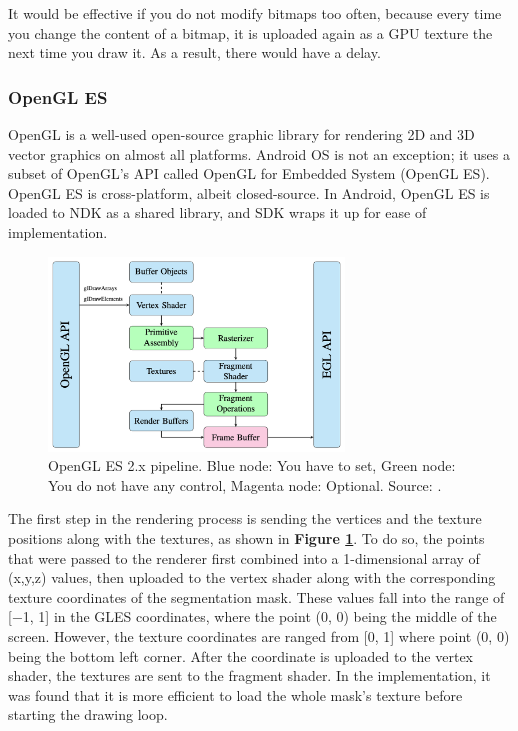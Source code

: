 It would be effective if you do not modify bitmaps too often, because every time you change the content of a bitmap, it is uploaded again as a GPU texture the next time you draw it. As a result, there would have a delay. \par

\subsubsection{OpenGL ES}
OpenGL is a well-used open-source graphic library for rendering 2D and 3D vector graphics on almost all platforms. Android OS is not an exception; it uses a subset of OpenGL’s API called OpenGL for Embedded System (OpenGL ES). OpenGL ES is cross-platform, albeit closed-source. In Android, OpenGL ES is loaded to NDK as a shared library, and SDK wraps it up for ease of implementation.
\par

\begin{figure} [H]
    \centering
    \includegraphics[width=0.7\textwidth]{chapter3/image/openglpipeline.png}
    \caption{OpenGL ES 2.x pipeline. Blue node: You have to set, Green node: You do not have any control, Magenta node: Optional. Source: \cite{openglpipeline}.}
    \label{fig:coordinates}
\end{figure}

The first step in the rendering process is sending the vertices and the texture positions along with the textures, as shown in \textbf{Figure \ref{fig:coordinates}}. To do so, the points that were passed to the renderer first combined into a 1-dimensional array of (x,y,z) values, then uploaded to the vertex shader along with the corresponding texture coordinates of the segmentation mask. These values fall into the range of [−1, 1] in the GLES coordinates, where the point (0, 0) being the middle of the screen. However, the texture coordinates are ranged from [0, 1] where point (0, 0) being the bottom left corner. After the coordinate is uploaded to the vertex shader, the textures are sent to the fragment shader. In the implementation, it was found that it is more efficient to load the whole mask's texture before starting the drawing loop.\par




